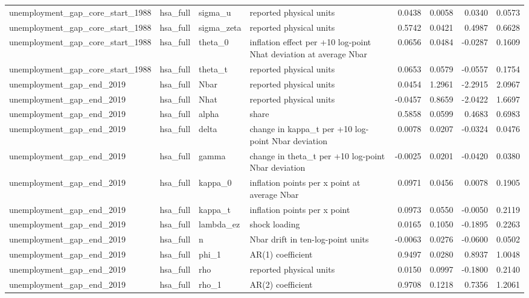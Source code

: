 \begin{tabular}{llllrrrr}
unemployment\_gap\_core\_start\_1988 & hsa\_full & sigma\_u & reported physical units & 0.0438 & 0.0058 & 0.0340 & 0.0573 \\
unemployment\_gap\_core\_start\_1988 & hsa\_full & sigma\_zeta & reported physical units & 0.5742 & 0.0421 & 0.4987 & 0.6628 \\
unemployment\_gap\_core\_start\_1988 & hsa\_full & theta\_0 & inflation effect per +10 log-point Nhat deviation at average Nbar & 0.0656 & 0.0484 & -0.0287 & 0.1609 \\
unemployment\_gap\_core\_start\_1988 & hsa\_full & theta\_t & reported physical units & 0.0653 & 0.0579 & -0.0557 & 0.1754 \\
unemployment\_gap\_end\_2019 & hsa\_full & Nbar & reported physical units & 0.0454 & 1.2961 & -2.2915 & 2.0967 \\
unemployment\_gap\_end\_2019 & hsa\_full & Nhat & reported physical units & -0.0457 & 0.8659 & -2.0422 & 1.6697 \\
unemployment\_gap\_end\_2019 & hsa\_full & alpha & share & 0.5858 & 0.0599 & 0.4683 & 0.6983 \\
unemployment\_gap\_end\_2019 & hsa\_full & delta & change in kappa\_t per +10 log-point Nbar deviation & 0.0078 & 0.0207 & -0.0324 & 0.0476 \\
unemployment\_gap\_end\_2019 & hsa\_full & gamma & change in theta\_t per +10 log-point Nbar deviation & -0.0025 & 0.0201 & -0.0420 & 0.0380 \\
unemployment\_gap\_end\_2019 & hsa\_full & kappa\_0 & inflation points per x point at average Nbar & 0.0971 & 0.0456 & 0.0078 & 0.1905 \\
unemployment\_gap\_end\_2019 & hsa\_full & kappa\_t & inflation points per x point & 0.0973 & 0.0550 & -0.0050 & 0.2119 \\
unemployment\_gap\_end\_2019 & hsa\_full & lambda\_ez & shock loading & 0.0165 & 0.1050 & -0.1895 & 0.2263 \\
unemployment\_gap\_end\_2019 & hsa\_full & n & Nbar drift in ten-log-point units & -0.0063 & 0.0276 & -0.0600 & 0.0502 \\
unemployment\_gap\_end\_2019 & hsa\_full & phi\_1 & AR(1) coefficient & 0.9497 & 0.0280 & 0.8937 & 1.0048 \\
unemployment\_gap\_end\_2019 & hsa\_full & rho & reported physical units & 0.0150 & 0.0997 & -0.1800 & 0.2140 \\
unemployment\_gap\_end\_2019 & hsa\_full & rho\_1 & AR(2) coefficient & 0.9708 & 0.1218 & 0.7356 & 1.2061 \\

\end{tabular}

